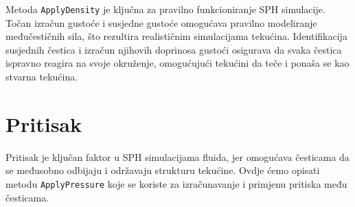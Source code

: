 \documentclass[diplomskirad]{fer}
\begin{document}
    Metoda \texttt{ApplyDensity} je ključna za pravilno funkcioniranje SPH simulacije.
    Točan izračun gustoće i susjedne gustoće omogućava pravilno modeliranje međučestičnih sila, što rezultira realističnim simulacijama tekućina.
    Identifikacija susjednih čestica i izračun njihovih doprinosa gustoći osigurava da svaka čestica ispravno reagira na svoje okruženje, omogućujući tekućini da teče i ponaša se kao stvarna tekućina.

    \section{Pritisak}\label{sec:pritisak}

    Pritisak je ključan faktor u SPH simulacijama fluida, jer omogućava česticama da se međusobno odbijaju i održavaju strukturu tekućine.
    Ovdje ćemo opisati metodu \texttt{ApplyPressure} koje se koriste za izračunavanje i primjenu pritiska među česticama.
\end{document}
